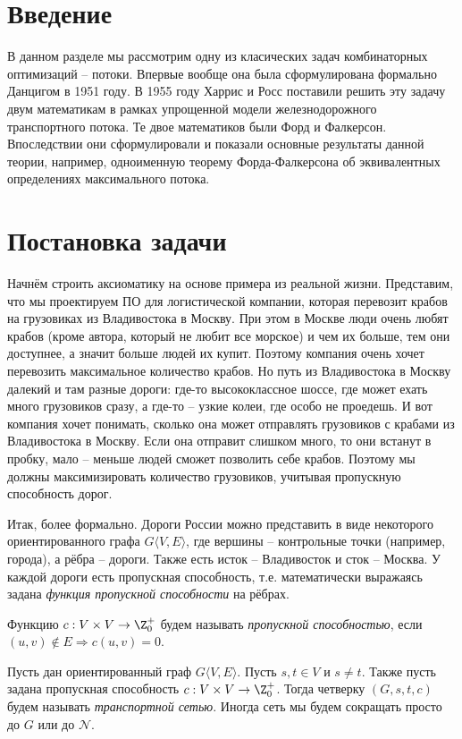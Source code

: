 \section{Введение}
В данном разделе мы рассмотрим одну из класических задач комбинаторных оптимизаций -- потоки. Впервые вообще она была сформулирована формально Данцигом в 1951 году. В 1955 году Харрис и Росс поставили решить эту задачу двум математикам в рамках упрощенной модели железнодорожного транспортного потока. Те двое математиков были Форд и Фалкерсон.
Впоследствии они сформулировали и показали основные результаты данной теории, например, одноименную теорему Форда-Фалкерсона об эквивалентных определениях максимального потока.

\section{Постановка задачи}

Начнём строить аксиоматику на основе примера из реальной жизни. 
Представим, что мы проектируем ПО для логистической компании, которая перевозит крабов на грузовиках из Владивостока в Москву.
При этом в Москве люди очень любят крабов (кроме автора, который не любит все морское) и чем их больше, тем они доступнее, а значит больше людей их купит.
Поэтому компания очень хочет перевозить максимальное количество крабов. Но путь из Владивостока в Москву далекий и там разные дороги: где-то высококлассное шоссе, где может ехать много грузовиков сразу, а где-то -- узкие колеи, где особо не проедешь.
И вот компания хочет понимать, сколько она может отправлять грузовиков с крабами из Владивостока в Москву. 
Если она отправит слишком много, то они встанут в пробку, мало -- меньше людей сможет позволить себе крабов.
Поэтому мы должны максимизировать количество грузовиков, учитывая пропускную способность дорог.

Итак, более формально. Дороги России можно представить в виде некоторого ориентированного графа $G \langle V, E \rangle$, где вершины -- контрольные точки (например, города), а рёбра -- дороги. Также есть исток -- Владивосток и сток -- Москва.
У каждой дороги есть пропускная способность, т.е. математически выражаясь задана \textit{функция пропускной способности} на рёбрах.

\Def Функцию $c: V \times V \to \Z^+_0$ будем называть \textit{пропускной способностью}, если $(u, v) \not\in E \Rightarrow c(u, v) = 0$.

\Def Пусть дан ориентированный граф $G \langle V, E \rangle$. Пусть $s, t \in V$ и $s \neq t$. Также пусть задана пропускная способность $c: V \times V \to \Z_0^+$. Тогда четверку $(G, s, t, c)$ будем называть \textit{транспортной сетью}.
Иногда сеть мы будем сокращать просто до $G$ или до $\mathcal{N}$.


